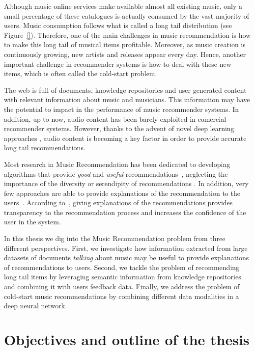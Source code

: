 Although music online services make available almost all existing music, only a small percentage of these catalogues is actually consumed by the vast majority of users. Music consumption follows what is called a long tail distribution \cite{oscarBook} (see Figure~\ref{}). Therefore, one of the main challenges in music recommendation is how to make this long tail of musical items profitable. Moreover, as music creation is continuously growing, new artists and releases appear every day. Hence, another important challenge in recommender systems is how to deal with these new items, which is often called the cold-start problem.

The web is full of documents, knowledge repositories and user generated content with relevant information about music and musicians. This information may have the potential to impact in the performance of music recommender systems. In addition, up to now, audio content has been barely exploited in comercial recommender systems. However, thanks to the advent of novel deep learning approaches \cite{Oord2013}, audio content is becoming a key factor in order to provide accurate long tail recommendations.

Most research in Music Recommendation has been dedicated to developing algorithms that provide \textit{good} and \textit{useful} recommendations~\cite{oscarBook}, neglecting the importance of the diversity or serendipity of recommendations \cite{TODO}. In addition, very few approaches are able to provide explanations of the recommendation to the users~\cite{Passant2008, Passant2010}. According to~\cite{celma2008new}, giving explanations of the recommendations provides transparency to the recommendation process and increases the confidence of the user in the system.

In this thesis we dig into the Music Recommendation problem from three different perspectives. First, we investigate how information extracted from large datasets of documents \textit{talking} about music may be useful to provide explanations of recommendations to users. Second, we tackle the problem of recommending long tail items by leveraging semantic information from knowledge repositories and combining it with users feedback data. Finally, we address the problem of cold-start music recommendations by combining different data modalities in a deep neural network.


\section{Objectives and outline of the thesis}
\label{sec:intro:objectives}

